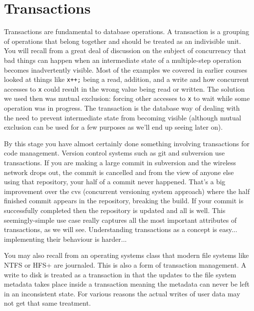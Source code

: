




\section*{Transactions} 

Transactions are fundamental to database operations. A transaction is a grouping of operations that belong together and should be treated as an indivisible unit. You will recall from a great deal of discussion on the subject of concurrency that bad things can happen when an intermediate state of a multiple-step operation becomes inadvertently visible. Most of the examples we covered in earlier courses looked at things like \texttt{x++;} being a read, addition, and a write and how concurrent accesses to \texttt{x} could result in the wrong value being read or written. The solution we used then was mutual exclusion: forcing other accesses to \texttt{x} to wait while some operation was in progress. The transaction is the database way of dealing with the need to prevent intermediate state from becoming visible (although mutual exclusion can be used for a few purposes as we'll end up seeing later on).

By this stage you have almost certainly done something involving transactions for code management. Version control systems such as git and subversion use transactions. If you are making a large commit in subversion and the wireless network drops out, the commit is cancelled and from the view of anyone else using that repository, your half of a commit never happened. That's a big improvement over the cvs (concurrent versioning system approach) where the half finished commit appears in the repository, breaking the build. If your commit is successfully completed then the repository is updated and all is well. This seemingly-simple use case really captures all the most important attributes of transactions, as we will see. Understanding transactions as a concept is easy... implementing their behaviour is harder...

You may also recall from an operating systems class that modern file systems like NTFS or HFS+ are journaled. This is also a form of transaction management. A write to disk is treated as a transaction in that the updates to the file system metadata takes place inside a transaction meaning the metadata can never be left in an inconsistent state. For various reasons the actual writes of user data may not get that same treatment.

